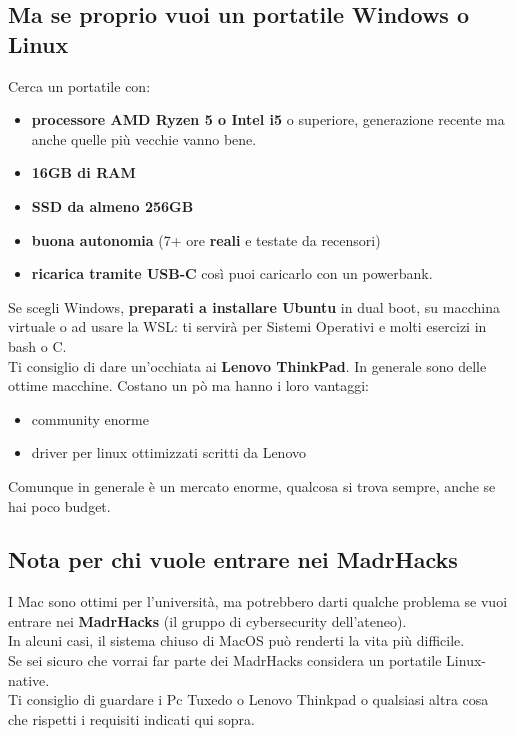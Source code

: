 \documentclass{article}
\begin{document}
\subsection{Ma se proprio vuoi un portatile Windows o Linux}
Cerca un portatile con:
\begin{itemize}
\item \textbf{processore AMD Ryzen 5 o Intel i5} o superiore, generazione recente ma anche quelle più vecchie vanno bene.
\item \textbf{16GB di RAM}
\item \textbf{SSD da almeno 256GB}
\item \textbf{buona autonomia} (7+ ore \textbf{reali} e testate da recensori)
\item \textbf{ricarica tramite USB-C} così puoi caricarlo con un powerbank.
\end{itemize}%
Se scegli Windows, \textbf{preparati a installare Ubuntu} in dual boot, su macchina virtuale o ad usare la WSL: ti servirà per Sistemi Operativi e molti esercizi in bash o C.\\
Ti consiglio di dare un'occhiata ai \textbf{Lenovo ThinkPad}. In generale sono delle ottime macchine. Costano un pò ma hanno i loro vantaggi:
\begin{itemize}
\item community enorme
\item driver per linux ottimizzati scritti da Lenovo
\end{itemize}%
Comunque in generale è un mercato enorme, qualcosa si trova sempre, anche se hai poco budget.


\subsection{Nota per chi vuole entrare nei MadrHacks}
I Mac sono ottimi per l’università, ma potrebbero darti qualche problema se vuoi entrare nei \textbf{MadrHacks} (il gruppo di cybersecurity dell’ateneo).\\
In alcuni casi, il sistema chiuso di MacOS può renderti la vita più difficile.\\
Se sei sicuro che vorrai far parte dei MadrHacks considera un portatile Linux-native.\\
Ti consiglio di guardare i Pc Tuxedo o Lenovo Thinkpad o qualsiasi altra cosa che rispetti i requisiti indicati qui sopra.
\end{document}
